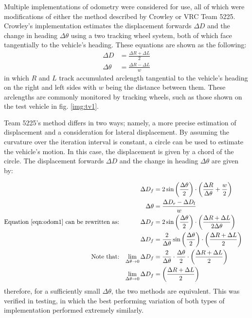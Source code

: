 \documentclass[12pt]{article}
\begin{document}
\begin{flushleft}
Multiple implementations of odometry were considered for use, all of which were modifications of either the method described by Crowley or VRC Team 5225. Crowley's implementation estimates the displacement forwards $\Delta D$ and the change in heading $\Delta \theta$ using a two tracking wheel system, both of which face tangentially to the vehicle's heading. These equations are shown as the following:
\begin{subequations}
\begin{align}
\Delta D &= \frac{\Delta R+\Delta L}{2} \\
\Delta \theta &= \frac{\Delta R- \Delta L}{w}
\end{align}
\end{subequations}
in which $R$ and $L$ track accumulated arclength tangential to the vehicle's heading on the right and left sides with $w$ being the distance between them. These arclengths are commonly monitored by tracking wheels, such as those shown on the test vehicle in fig. \ref{img:tv1}.

Team 5225's method differs in two ways; namely, a more precise estimation of displacement and a consideration for lateral displacement. By assuming the curvature over the iteration interval is constant, a circle can be used to estimate the vehicle's motion. In this case, the displacement is given by a chord of the circle. The displacement forwards $\Delta D$ and the change in heading $\Delta \theta$ are given by:

\begin{subequations}
\begin{flalign}
&&\Delta D_f &= 2\sin{\left(\frac{\Delta\theta}{2}\right)} \cdot \left(\frac{\Delta R}{\Delta \theta}+\frac{w}{2}\right) \label{eqn:odom1} &&\\
&&\Delta \theta &= \frac{\Delta D_r- \Delta D_l}{w} &&\\
\text{Equation \ref{eqn:odom1} can be rewritten as:} 
&&\Delta D_f &= 2\sin{\left(\frac{\Delta\theta}{2}\right)} \cdot \left(\frac{\Delta R + \Delta L}{2\Delta \theta}\right) &&\\
&&\Delta D_f &= \frac{2}{\Delta \theta}\sin{\left(\frac{\Delta\theta}{2}\right)} \cdot \left(\frac{\Delta R + \Delta L}{2}\right) &&\\
\text{Note that:} 
&&\lim_{\Delta\theta\to 0} \Delta D_f &= \frac{2}{\Delta \theta} \cdot \frac{\Delta\theta}{2} \cdot \left(\frac{\Delta R + \Delta L}{2}\right) &&\\ 
&&\lim_{\Delta\theta\to 0} \Delta D_f &= \left(\frac{\Delta R + \Delta L}{2}\right) &&
\end{flalign}
\end{subequations}
therefore, for a sufficiently small $\Delta \theta$, the two methods are equivalent. This was verified in testing, in which the best performing variation of both types of implementation performed extremely similarly.


\end{flushleft}
\end{document}
